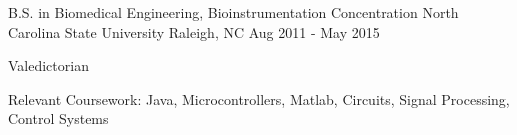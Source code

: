 

\begin{cventries}

  \cventry
    {B.S. in Biomedical Engineering, Bioinstrumentation Concentration} %
    {North Carolina State University} %
    {Raleigh, NC} %
    {Aug 2011 - May 2015} %
    {
      \begin{cvitems} %
        \item {Valedictorian}
        \item {Relevant Coursework: Java, Microcontrollers, Matlab, Circuits, Signal Processing, Control Systems}
      \end{cvitems}
    }


\end{cventries}

